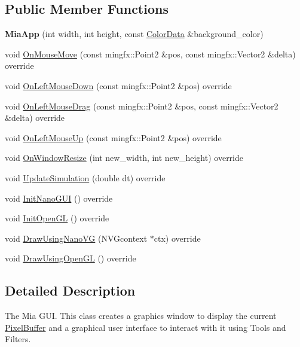 \subsection*{Public Member Functions}
\begin{DoxyCompactItemize}
\item 
\mbox{\label{classimage__tools_1_1MiaApp_a615e8559a662c54a9f2487a7d6a55b57}} 
{\bfseries Mia\+App} (int width, int height, const \hyperlink{classimage__tools_1_1ColorData}{Color\+Data} \&background\+\_\+color)
\item 
void \hyperlink{classimage__tools_1_1MiaApp_a2b65628198da98dec676c57af8ff881c}{On\+Mouse\+Move} (const mingfx\+::\+Point2 \&pos, const mingfx\+::\+Vector2 \&delta) override
\item 
void \hyperlink{classimage__tools_1_1MiaApp_add49ee649aa2cd4f5a48cbe7ce932011}{On\+Left\+Mouse\+Down} (const mingfx\+::\+Point2 \&pos) override
\item 
void \hyperlink{classimage__tools_1_1MiaApp_a0a2f072e2a386bffd3ea9925807d1381}{On\+Left\+Mouse\+Drag} (const mingfx\+::\+Point2 \&pos, const mingfx\+::\+Vector2 \&delta) override
\item 
void \hyperlink{classimage__tools_1_1MiaApp_af386887e8245037fed9d615890cee417}{On\+Left\+Mouse\+Up} (const mingfx\+::\+Point2 \&pos) override
\item 
void \hyperlink{classimage__tools_1_1MiaApp_a81597364eeca01df8e26cfb6bf037ffe}{On\+Window\+Resize} (int new\+\_\+width, int new\+\_\+height) override
\item 
void \hyperlink{classimage__tools_1_1MiaApp_a601e7b8b38ca77b8c6bf81b421fda18b}{Update\+Simulation} (double dt) override
\item 
void \hyperlink{classimage__tools_1_1MiaApp_a83654a0b4e70c1b6b16e1b10d9becaad}{Init\+Nano\+G\+UI} () override
\item 
void \hyperlink{classimage__tools_1_1MiaApp_ac59579850ed3ebdfcc1885f88238e887}{Init\+Open\+GL} () override
\item 
void \hyperlink{classimage__tools_1_1MiaApp_af7498f998abe700b139f8600eb9e882b}{Draw\+Using\+Nano\+VG} (N\+V\+Gcontext $\ast$ctx) override
\item 
void \hyperlink{classimage__tools_1_1MiaApp_a0633d685229af3678546abcf1515362f}{Draw\+Using\+Open\+GL} () override
\end{DoxyCompactItemize}


\subsection{Detailed Description}
The Mia G\+UI. This class creates a graphics window to display the current \hyperlink{classimage__tools_1_1PixelBuffer}{Pixel\+Buffer} and a graphical user interface to interact with it using Tools and Filters. 

